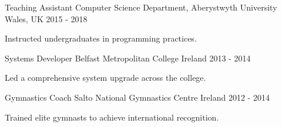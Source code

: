 \begin{cventries}
  \cventry
    {Teaching Assistant} %
    {Computer Science Department, Aberystwyth University} %
    {Wales, UK} %
    {2015 - 2018} %
    {
      \begin{cvitems}
        \item {Instructed undergraduates in programming practices.}
      \end{cvitems}
    }

  \cventry
    {Systems Developer} %
    {Belfast Metropolitan College} %
    {Ireland} %
    {2013 - 2014} %
    {
      \begin{cvitems}
        \item {Led a comprehensive system upgrade across the college.}
      \end{cvitems}
    }

  \cventry
    {Gymnastics Coach} %
    {Salto National Gymnastics Centre} %
    {Ireland} %
    {2012 - 2014 } %
    {
      \begin{cvitems}
        \item {Trained elite gymnasts to achieve international recognition.}
      \end{cvitems}
    }

\end{cventries}
